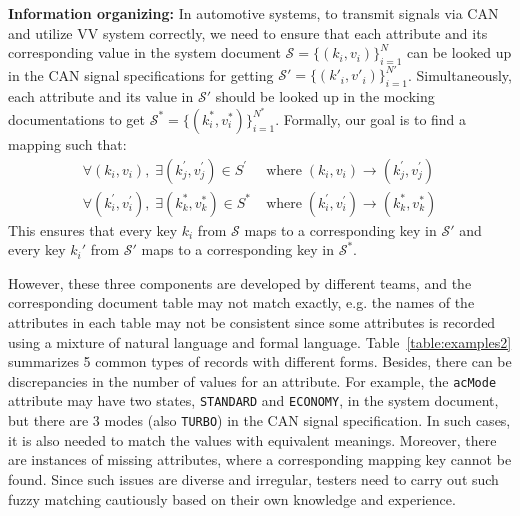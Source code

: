 \textbf{Information organizing:}
In automotive systems, to transmit signals via CAN and utilize VV system correctly, we need to ensure that each attribute and its corresponding value in the system document $\mathcal{S} = \{(k_i, v_i)\}_{i=1}^N$ can be looked up in the CAN signal specifications for getting $\mathcal{S'} = \{(k'_i, v'_i)\}_{i=1}^{N'}$. 
Simultaneously, each attribute and its value in $\mathcal{S'}$ should be looked up in the mocking documentations to get $\mathcal{S^*} = \{(k^*_i, v^*_i)\}_{i=1}^{N^{*}}$. Formally, our goal is to find a mapping such that:
\begin{equation}
  \begin{aligned}
      \forall (k_i, v_i), \;  \exists (k_{j}^{'}, v_j^{'}) \in S^{'} \; &\text{where} \; (k_i, v_i) \rightarrow (k_{j}^{'}, v_j^{'}) \\
      \forall (k_i^{'}, v_i^{'}), \;  \exists (k_{k}^{*}, v_k^{*}) \in S^{*} \; &\text{where} \;  (k_i^{'}, v_i^{'}) \rightarrow (k_{k}^{*}, v_k^{*})
\end{aligned}
\end{equation}
This ensures that every key $k_i$ from $\mathcal{S}$ maps to a corresponding key in $\mathcal{S'}$ and every key $k_i'$ from $\mathcal{S'}$ maps to a corresponding key in \( \mathcal{S^*} \).

However, these three components are developed by different teams, and the corresponding document table may not match exactly, e.g. the names of the attributes in each table may not be consistent since some attributes is recorded using a mixture of natural language and formal language. Table~\ref{table:examples2} summarizes 5 common types of records with different forms. 
Besides, there can be discrepancies in the number of values for an attribute. For example, the \texttt{acMode} attribute may have two states, \texttt{STANDARD} and \texttt{ECONOMY}, in the system document, but there are 3 modes (also \texttt{TURBO}) in the CAN signal specification. In such cases, it is also needed to match the values with equivalent meanings.
Moreover, there are instances of missing attributes, where a corresponding mapping key cannot be found. 
Since such issues are diverse and irregular, testers need to carry out such fuzzy matching cautiously based on their own knowledge and experience.

